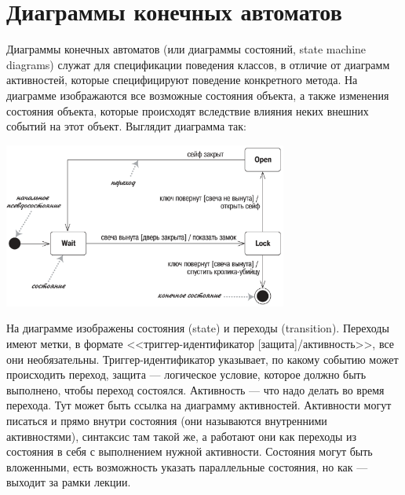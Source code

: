 \documentclass[a5paper]{article}
\begin{document}
\section{Диаграммы конечных автоматов}

Диаграммы конечных автоматов (или диаграммы состояний, state machine diagrams) служат для спецификации поведения классов, в отличие от диаграмм активностей, которые специфицируют поведение конкретного метода. На диаграмме изображаются все возможные состояния объекта, а также изменения состояния объекта, которые происходят вследствие влияния неких внешних событий на этот объект. Выглядит диаграмма так:

\begin{center}
    \includegraphics[width=0.7\textwidth]{stateTransitionSyntax.png}
\end{center}

На диаграмме изображены состояния (state) и переходы (transition). Переходы имеют метки, в формате <<триггер-идентификатор [защита]/активность>>, все они необязательны. Триггер-идентификатор указывает, по какому событию может происходить переход, защита --- логическое условие, которое должно быть выполнено, чтобы переход состоялся. Активность --- что надо делать во время перехода. Тут может быть ссылка на диаграмму активностей. Активности могут писаться и прямо внутри состояния (они называются внутренними активностями), синтаксис там такой же, а работают они как переходы из состояния в себя с выполнением нужной активности. Состояния могут быть вложенными, есть возможность указать параллельные состояния, но как --- выходит за рамки лекции.
\end{document}
